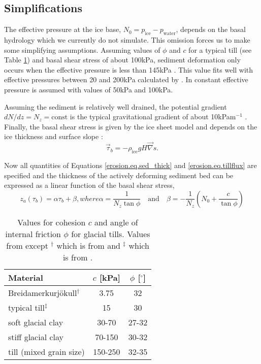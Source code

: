 \subsection{Simplifications}
The effective pressure at the ice base, $N_0=p_{\text{ice}}-p_{\text{water}}$, depends on the basal hydrology which we currently do not simulate. This omission forces us to make some simplifying assumptions. Assuming values of $\phi$ and $c$ for a typical till (see Table \ref{erosion.tab.typical_till}) and basal shear stress of about 100kPa, sediment deformation only occurs when the effective pressure is less than 145kPa \citep{Paterson1994}. This value fits well with effective pressures between 20 and 200kPa calculated by \citet{Boulton1996a}. In \citet{Boulton1996} constant effective pressure is assumed with values of 50kPa and 100kPa.

Assuming the sediment is relatively well drained, the potential gradient $dN/dz=N_z=\text{const}$ is the typical gravitational gradient of about 10kPam$^{-1}$ \citep{Boulton1996a}. Finally, the basal shear stress is given by the ice sheet model and depends on the ice thickness and surface slope \citep{Paterson1994}:
\begin{equation}
  \vec\tau_b=-\rho_{\text{ice}}gH\vec\nabla s.
\end{equation}

Now all quantities of Equations \eqref{erosion.eq.sed_thick} and \eqref{erosion.eq.tillflux} are specified and the thickness of the actively deforming sediment bed can be expressed as a linear function of the basal shear stress,
\begin{subequations}
  \begin{equation}
    \label{erosion.eq.sed_thick_param}
    z_a(\tau_b)=\alpha\tau_b+\beta,
  \end{equation}
  where
  \begin{equation}
    \alpha=\frac1{N_z\tan\phi}\quad\text{and}\quad\beta=-\frac1{N_z}\left({N_0}+\frac{c}{\tan\phi}\right)
  \end{equation}
\end{subequations}

\begin{table}[htbp]
  \centering
  \begin{tabular}{|l|cc|}
    \hline
    Material & $c$ [kPa] & $\phi$ [$^\circ$]\\
    \hline
    Breidamerkurj\"okull$^\dag$ & 3.75 & 32\\
    typical till$^\ddag$ & 15 & 30\\
    soft glacial clay & 30-70 & 27-32\\
    stiff glacial clay & 70-150 & 30-32\\
    till (mixed grain size) & 150-250 & 32-35\\
    \hline
  \end{tabular}
  \caption{Values for cohesion $c$ and angle of internal friction $\phi$ for glacial tills. Values from \citet{Benn1998} except $^\dag$ which is from \citet{Boulton1987} and $^\ddag$ which is from \citet{Clarke1987}.}
  \label{erosion.tab.typical_till}
\end{table}


